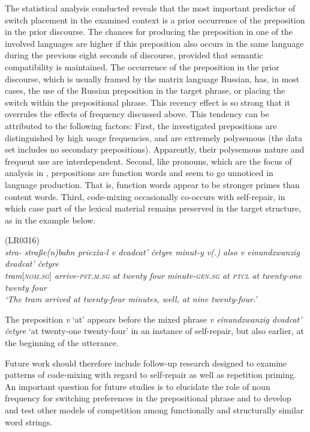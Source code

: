 The statistical analysis conducted reveals that the most important predictor of switch placement in the examined context is a prior occurrence of the preposition in the prior discourse. The chances for producing the preposition in one of the involved languages are higher if this preposition also occurs in the same language during the previous eight seconds of discourse, provided that semantic compatibility is maintained. The occurrence of the preposition in the prior discourse, which is usually framed by the matrix language Russian, has, in most cases, the use of the Russian preposition in the target phrase, or placing the switch within the prepositional phrase. This recency effect is so strong that it overrules the effects of frequency discussed above. This tendency can be attributed to the following factors: First, the investigated prepositions are distinguished by high usage frequencies, and are extremely polysemous (the data set includes no secondary prepositions). Apparently, their polysemous nature and frequent use are interdependent. Second, like pronouns, which are the focus of analysis in \citep{torres-travis}, prepositions are function words and seem to go unnoticed in language production. That is, function words appear to be stronger primes than content words. Third, code-mixing occasionally co-occurs with self-repair, in which case part of the lexical material remains preserved in the target structure, as in the example below.

\ea
\label{ex:5:17}
(LR0316)\\
\gll \itshape{stra-} \itshape{stra{ß}e(n)bahn} {priezža-l} {v} {dvadcat'} {četyre} {minut-y} {v(.)} \textit{also} {v} \textit{einundzwanzig} {dvadcat'} {četyre}\\
	{} {tram\([\)\textsc{nom.sg}\(]\)} arrive-\textsc{pst.m.sg} at twenty four minute-\textsc{gen.sg} at \textsc{ptcl} at twenty-one twenty four\\
\glt `The tram arrived at twenty-four minutes, well, at nine twenty-four.'
\z

\noindent The preposition \textit{v} `at' appears before the mixed phrase \textit{v einundzwanzig dvadcat' četyre} `at twenty-one twenty-four' in an instance of self-repair, but also earlier, at the beginning of the utterance. 

Future work should therefore include follow-up research designed to examine patterns of code-mixing with regard to self-repair as well as repetition priming. An important question for future studies is to elucidate the role of noun frequency for switching preferences in the prepositional phrase and to develop and test other models of competition among functionally and structurally similar word strings. 

